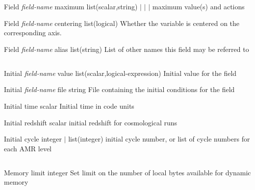\documentclass{article}
\begin{document}
\Parameter
{Field}
{\textit{field-name}}
{maximum}
{list(scalar,string)}
{ $|$  $|$  $|$ }
{maximum value(s) and actions }
{}
{}

\Parameter
{Field}
{\textit{field-name}}
{centering}
{list(logical)}
{}
{Whether the variable is centered on the corresponding axis.}
{}
{}

\Parameter
{Field}
{\textit{field-name}}
{alias}
{list(string)}
{}
{List of other names this field may be referred to}
{}
{}

\subsection{}

\Parameter
{Initial}
{\textit{field-name}}
{value}
{list(scalar,logical-expression)}
{}
{Initial value for the field}
{}
{}

\Parameter
{Initial}
{\textit{field-name}}
{file}
{string}
{}
{File containing the initial conditions for the field}
{}
{}

\Parameter
{Initial}
{}
{time}
{scalar}
{}
{Initial time in code units}
{}
{}

\Parameter
{Initial}
{}
{redshift}
{scalar}
{}
{initial redshift for cosmological runs}
{}
{}

\Parameter
{Initial}
{}
{cycle}
{integer $|$ list(integer)}
{}
{initial cycle number, or list of cycle numbers for each AMR level}
{}
{}

\subsection{}

\Parameter
{Memory}
{}
{limit}
{integer}
{}
{Set limit on the number of local bytes available for dynamic memory}
{}
{}
\end{document}
